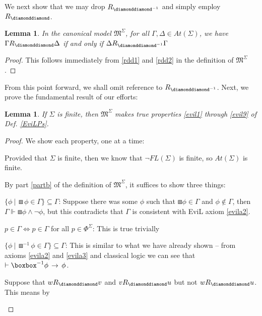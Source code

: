 \documentclass[11pt]{article}
\newtheorem{lemma}[theorem]{Lemma}
\newcommand{\BB}{\boxbox}
\newcommand{\DD}{\diamonddiamond}
\begin{document}
We next show that we may drop $R_{\DD^{-1}}$ and simply employ $R_\DD$.
\begin{lemma}
In the canonical model $\mathfrak{M}^\Sigma$, for all $\Gamma,\Delta \in At(\Sigma)$, we have $\Gamma R_\DD \Delta$ if and only if $\Delta R_{\DD^{-1}} \Gamma$
\end{lemma}
\begin{proof}
This follows immediately from \ref{rdd1} and \ref{rdd2} in the definition of $\mathfrak{M}^\Sigma$.
\end{proof}

From this point forward, we shall omit reference to $R_{\DD^{-1}}$. Next, we prove the fundamental result of our efforts: %
\begin{lemma}\label{ddrev}
If $\Sigma$ is finite, then $\mathfrak{M}^\Sigma$ makes true properties \emph{\ref{evil1}} through \emph{\ref{evil9}} of Def. \ref{EviLPs}.
\end{lemma}
\begin{proof} We show each property, one at a time:
\begin{myroman}
	\item Provided that $\Sigma$ is finite, then we know that $\neg FL(\Sigma)$ is finite, so $At(\Sigma)$ is finite.
	\item By part \ref{partb} of the definition of $\mathfrak{M}^\Sigma$, it suffices to show three things:
	\begin{mynum}
	         \item  $\{\phi \ |\  \BB \phi \in \Gamma\} \subseteq  \Gamma$:  Suppose there was some $\phi$ such that $\BB \phi \in \Gamma$ and $\phi \nin \Gamma$, then $\Gamma \Vdash \BB\phi \wedge \neg \phi$, but this contradicts that $\Gamma$ is consistent with  \textsf{EviL} axiom \ref{evila2}.
	         \item $p \in \Gamma \iff p \in \Gamma$ for all $p \in \Phi^\Sigma$:  This is true trivially
	         \item  $\{\phi \ |\  \BB^{-1} \phi \in \Gamma\} \subseteq  \Gamma$:  This is similar to what we have already shown -- from axioms \ref{evila2} and \ref{evila3} and classical logic we can see that $\vdash \BB^{-1} \phi \IMPL \phi$.
	\end{mynum}
	\item Suppose that $w R_\DD v$ and $v R_\DD u$ but not $w R_\DD u$.  This means by 
\end{myroman}
\end{proof}
\end{document}

